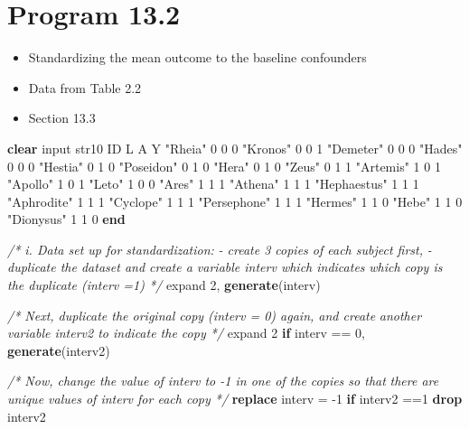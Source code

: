 \documentclass[
  10pt,
]{book}
\newenvironment{Shaded}{\begin{snugshade}}{\end{snugshade}}
\newcommand{\CommentTok}[1]{\textcolor[rgb]{0.56,0.35,0.01}{\textit{#1}}}
\newcommand{\KeywordTok}[1]{\textcolor[rgb]{0.13,0.29,0.53}{\textbf{#1}}}
\newcommand{\NormalTok}[1]{#1}
\newcommand{\StringTok}[1]{\textcolor[rgb]{0.31,0.60,0.02}{#1}}
\providecommand{\tightlist}{%
  \setlength{\itemsep}{0pt}\setlength{\parskip}{0pt}}
\begin{document}
\hypertarget{program-13.2-1}{%
\section{Program 13.2}\label{program-13.2-1}}

\begin{itemize}
\tightlist
\item
  Standardizing the mean outcome to the baseline confounders
\item
  Data from Table 2.2
\item
  Section 13.3
\end{itemize}

\begin{Shaded}
\begin{Highlighting}[]
\KeywordTok{clear}
\NormalTok{input str10 ID L A Y}
\StringTok{"Rheia"}\NormalTok{     0 0 0 }
\StringTok{"Kronos"}\NormalTok{    0 0 1 }
\StringTok{"Demeter"}\NormalTok{   0 0 0 }
\StringTok{"Hades"}\NormalTok{     0 0 0 }
\StringTok{"Hestia"}\NormalTok{    0 1 0 }
\StringTok{"Poseidon"}\NormalTok{  0 1 0 }
\StringTok{"Hera"}\NormalTok{      0 1 0 }
\StringTok{"Zeus"}\NormalTok{      0 1 1 }
\StringTok{"Artemis"}\NormalTok{   1 0 1}
\StringTok{"Apollo"}\NormalTok{    1 0 1}
\StringTok{"Leto"}\NormalTok{      1 0 0}
\StringTok{"Ares"}\NormalTok{      1 1 1}
\StringTok{"Athena"}\NormalTok{    1 1 1}
\StringTok{"Hephaestus"}\NormalTok{ 1 1 1}
\StringTok{"Aphrodite"}\NormalTok{ 1 1 1}
\StringTok{"Cyclope"}\NormalTok{   1 1 1}
\StringTok{"Persephone"}\NormalTok{ 1 1 1}
\StringTok{"Hermes"}\NormalTok{    1 1 0}
\StringTok{"Hebe"}\NormalTok{      1 1 0}
\StringTok{"Dionysus"}\NormalTok{  1 1 0 }
\KeywordTok{end}

\CommentTok{/* i. Data set up for standardization: }
\CommentTok{ {-} create 3 copies of each subject first, }
\CommentTok{ {-} duplicate the dataset and create a variable \textasciigrave{}interv\textasciigrave{} which indicates}
\CommentTok{which copy is the duplicate (interv =1) */}
\NormalTok{expand 2, }\KeywordTok{generate}\NormalTok{(interv)}

\CommentTok{/* Next, duplicate the original copy (interv = 0) again, and create}
\CommentTok{another variable \textquotesingle{}interv2\textquotesingle{} to indicate the copy */}
\NormalTok{expand 2 }\KeywordTok{if}\NormalTok{ interv == 0, }\KeywordTok{generate}\NormalTok{(interv2)}

\CommentTok{/* Now, change the value of \textquotesingle{}interv\textquotesingle{} to {-}1 in one of the copies so that}
\CommentTok{there are unique values of interv for each copy */}
\KeywordTok{replace}\NormalTok{ interv = {-}1  }\KeywordTok{if}\NormalTok{ interv2 ==1}
\KeywordTok{drop}\NormalTok{ interv2}


\end{Highlighting}
\end{Shaded}
\end{document}

